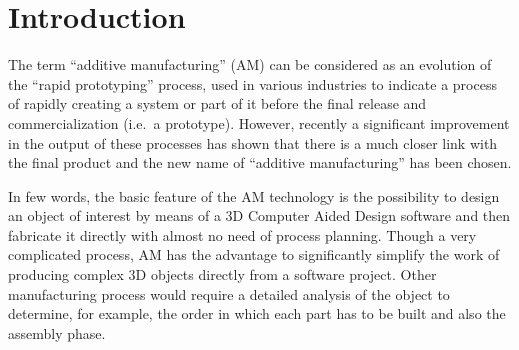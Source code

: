 
\chapter{Introduction}

The term ``additive manufacturing'' (AM) can be considered as an evolution of the ``rapid prototyping'' process, used in various industries to indicate a process of rapidly creating a system or part of it before the final release and commercialization (i.e.\ a prototype). However, recently a significant improvement in the output of these processes has shown that there is a much closer link with the final product and the new name of ``additive manufacturing'' has been chosen.

In few words, the basic feature of the AM technology is the possibility to design an object of interest by means of a 3D Computer Aided Design software and then fabricate it directly with almost no need of process planning. Though a very complicated process, AM has the advantage to significantly simplify the work of producing complex 3D objects directly from a software project. Other manufacturing process would require a detailed analysis of the object to determine, for example, the order in which each part has to be built and also the assembly phase.




